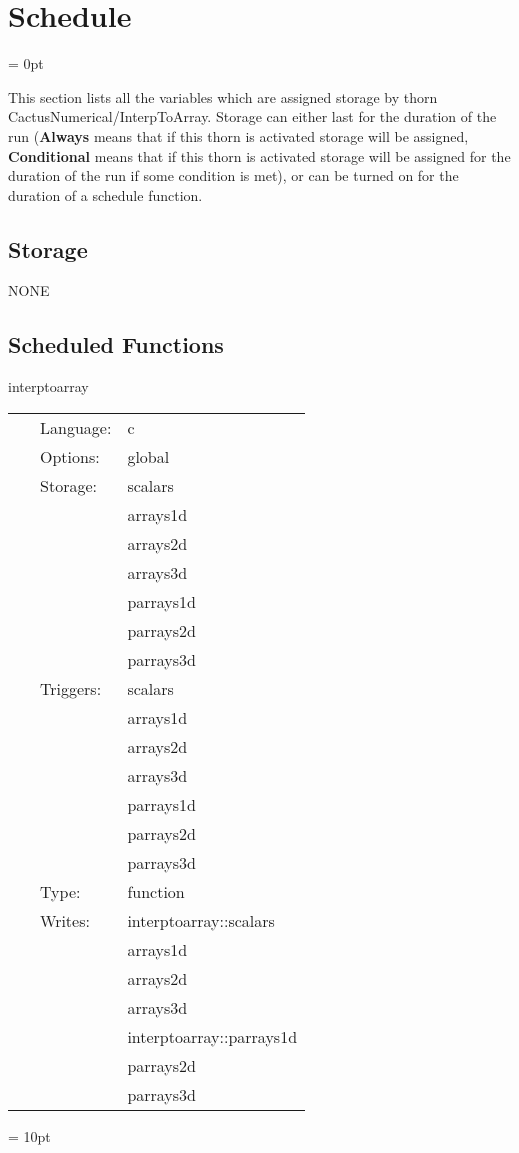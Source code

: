 
\section{Schedule} 


\parskip = 0pt


\noindent This section lists all the variables which are assigned storage by thorn CactusNumerical/InterpToArray.  Storage can either last for the duration of the run ({\bf Always} means that if this thorn is activated storage will be assigned, {\bf Conditional} means that if this thorn is activated storage will be assigned for the duration of the run if some condition is met), or can be turned on for the duration of a schedule function.


\subsection*{Storage}NONE
\subsection*{Scheduled Functions}
\vspace{5mm}


\hspace{5mm} interptoarray 

\hspace{5mm}{\it interpolate to grid arrays } 


\hspace{5mm}

 \begin{tabular*}{160mm}{cll} 
~ & Language:  & c \\ 
~ & Options:  & global \\ 
~ & Storage:  & scalars \\ 
~& ~ &arrays1d\\ 
~& ~ &arrays2d\\ 
~& ~ &arrays3d\\ 
~& ~ &parrays1d\\ 
~& ~ &parrays2d\\ 
~& ~ &parrays3d\\ 
~ & Triggers:  & scalars \\ 
~& ~ &arrays1d\\ 
~& ~ &arrays2d\\ 
~& ~ &arrays3d\\ 
~& ~ &parrays1d\\ 
~& ~ &parrays2d\\ 
~& ~ &parrays3d\\ 
~ & Type:  & function \\ 
~ & Writes:  & interptoarray::scalars \\ 
~& ~ &arrays1d\\ 
~& ~ &arrays2d\\ 
~& ~ &arrays3d\\ 
~& ~ &interptoarray::parrays1d\\ 
~& ~ &parrays2d\\ 
~& ~ &parrays3d\\ 
\end{tabular*} 



\vspace{5mm}\parskip = 10pt 
